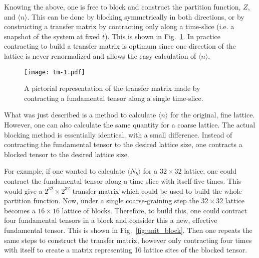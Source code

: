 \documentclass[../main.tex]{subfiles}
\begin{document}
Knowing the above, one is free to block and construct the partition function, $Z$, and $\langle n \rangle$.  This can
be done by blocking symmetrically in both directions, or by constructing a transfer matrix by contracting only along a
time-slice (i.e. a snapshot of the system at fixed $t$).  This is shown in Fig.~\ref{fig:tm}.  In practice contracting
to build a transfer matrix is optimum since one direction of the lattice is never renormalized and allows the easy
calculation of $\langle n \rangle$.
%
\begin{figure}[htpb]
    \centering
	\texttt{[image: tm-1.pdf]}
    \caption{A pictorial representation of the transfer matrix made by
    contracting a fundamental tensor along a single time-slice.}
    \label{fig:tm}
\end{figure}
%
What was just described is a method to calculate $\langle n \rangle$ for the original, fine lattice.  However, one can
also calculate the same quantity for a coarse lattice.  The actual blocking method is essentially identical, with a
small difference.  Instead of contracting the fundamental tensor to the desired lattice size, one contracts a blocked
tensor to the desired lattice size.

For example, if one wanted to calculate $\langle N_{b} \rangle$ for a $32 \times 32$ lattice, one could contract the
fundamental tensor along a time slice with itself five times.  This would give a $2^{32} \times 2^{32}$ transfer matrix
which could be used to build the whole partition function.  Now, under a single coarse-graining step the $32\times 32$
lattice becomes a $16\times 16$ lattice of blocks.  Therefore, to build this, one could contract four fundamental
tensors in a block and consider this a new, effective fundamental tensor.  This is shown in Fig.~\ref{fig:unit_block}.
Then one repeats the same steps to construct the transfer matrix, however only contracting four times with itself to
create a matrix representing 16 lattice sites of the blocked tensor.
\end{document}
